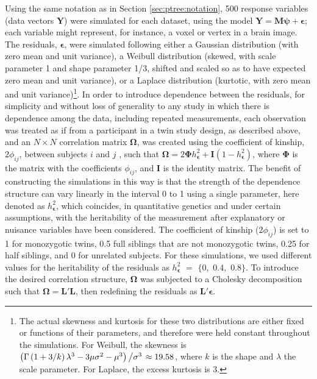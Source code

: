 Using the same notation as in Section \ref{sec:ptree:notation}, 500 response variables (data vectors $\mathbf{Y}$) were simulated for each dataset, using the model $\mathbf{Y} = \mathbf{M}\boldsymbol{\psi} + \boldsymbol{\epsilon}$; each variable might represent, for instance, a voxel or vertex in a brain image. The residuals, $\boldsymbol{\epsilon}$, were simulated following either a Gaussian distribution (with zero mean and unit variance), a Weibull distribution (skewed, with scale parameter 1 and shape parameter 1/3, shifted and scaled so as to have expected zero mean and unit variance), or a Laplace distribution (kurtotic, with zero mean and unit variance)\footnote{The actual skewness and kurtosis for these two distributions are either fixed or functions of their parameters, and therefore were held constant throughout the simulations. For Weibull, the skewness is $\left(\Gamma\left(1+3/k\right)\lambda^3-3\mu\sigma^2-\mu^3\right)\left/\sigma^3\right. \approx 19.58$, where $k$ is the shape and $\lambda$ the scale parameter. For Laplace, the excess kurtosis is $3$.}. In order to introduce dependence between the residuals, for simplicity and without loss of generality to any study in which there is dependence among the data, including repeated measurements, each observation was treated as if from a participant in a twin study design, as described above, and an $N \times N$ correlation matrix $\boldsymbol{\Omega}$, was created using the coefficient of kinship, $2\phi_{ij}$, between subjects $i$ and $j$ \citep{Jacquard1970}, such that $\boldsymbol{\Omega}=2\boldsymbol{\Phi}h_{\boldsymbol{\epsilon}}^{2} + \mathbf{I}(1-h_{\boldsymbol{\epsilon}}^{2})$, where $\boldsymbol{\Phi}$ is the matrix with the coefficients $\phi_{ij}$, and $\mathbf{I}$ is the identity matrix. The benefit of constructing the simulations in this way is that the strength of the dependence structure can vary linearly in the interval 0 to 1 using a single parameter, here denoted as $h_{\boldsymbol{\epsilon}}^{2}$, which coincides, in quantitative genetics and under certain assumptions, with the heritability of the measurement after explanatory or nuisance variables have been considered. The coefficient of kinship ($2\phi_{ij}$) is set to 1 for monozygotic twins, 0.5 full siblings that are not monozygotic twins, 0.25 for half siblings, and 0 for unrelated subjects. For these simulations, we used different values for the heritability of the residuals as $h_{\boldsymbol{\epsilon}}^{2}$ $=$ $\{0,$ $0.4,$ $0.8\}$. To introduce the desired correlation structure, $\boldsymbol{\Omega}$ was subjected to a Cholesky decomposition such that $\boldsymbol{\Omega}=\mathbf{L}'\mathbf{L}$, then redefining the residuals as $\mathbf{L}'\boldsymbol{\epsilon}$.

